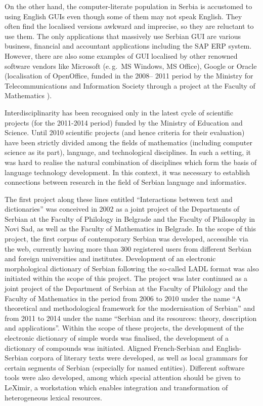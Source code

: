 \begin{multicols}{2}
On the other hand, the computer-literate population in Serbia is accustomed to using English GUIs even though some of them may not speak English. They often find the localised versions awkward and imprecise, so they are reluctant to use them. The only applications that massively use Serbian GUI are various business, financial and accountant applications including the SAP ERP system. However, there are also some examples of GUI localised by other renowned software vendors like Microsoft (e.\,g.~MS Windows, MS Office), Google or Oracle (localisation of OpenOffice, funded in the 2008-- 2011 period by the Ministry for Telecommunications and Information Society through a project at the Faculty of Mathematics \cite{OO_MATF}).

Interdisciplinarity has been recognised only in the latest cycle of scientific projects (for the 2011-2014 period) funded by the Ministry of Education and Science. Until 2010 scientific projects (and hence criteria for their evaluation) have been strictly divided among the fields of mathematics (including computer science as its part), language, and technological disciplines. In such a setting, it was hard to realise the natural combination of disciplines which form the basis of language technology development. In this context, it was necessary to establish connections between research in the field of Serbian language and informatics. 

The first project along these lines entitled “Interactions between text and dictionaries” was conceived in 2002 as a joint project of the Departments of Serbian at the Faculty of Philology in Belgrade and the Faculty of Philosophy in Novi Sad, as well as the Faculty of Mathematics in Belgrade. In the scope of this project, the first corpus of contemporary Serbian was developed, \cite{KORPUS} accessible via the web, currently having more than 300 registered users from different Serbian and foreign universities and institutes. Development of an electronic morphological dictionary of Serbian following the so-called LADL format was also initiated within the scope of this project. \cite{KRSTEV} The project was later continued as a joint project of the Department of Serbian at the Faculty of Philology and the Faculty of Mathematics in the period from 2006 to 2010 under the name “A theoretical and methodological framework for the modernisation of Serbian” and from 2011 to 2014 under the name “Serbian and its resources: theory, description and applications”. Within the scope of these projects, the development of the electronic dictionary of simple words was finalised, the development of a dictionary of compounds was initiated. Aligned French-Serbian and English-Serbian corpora of literary texts were developed, as well as local grammars for certain segments of Serbian (especially for named entities). Different software tools were also developed, among which special attention should be given to LeXimir, a workstation which enables integration and transformation of heterogeneous lexical resources.
 

\end{multicols}
